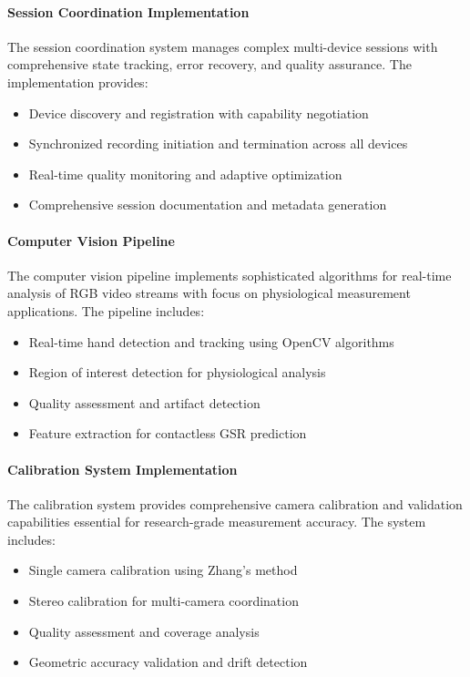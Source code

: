 \documentclass[12pt,a4paper]{report}
\begin{document}
\paragraph{Session Coordination Implementation}

The session coordination system manages complex multi-device sessions with comprehensive state tracking, error recovery,
and quality assurance. The implementation provides:

\begin{itemize}
\item Device discovery and registration with capability negotiation
\item Synchronized recording initiation and termination across all devices
\item Real-time quality monitoring and adaptive optimization
\item Comprehensive session documentation and metadata generation

\end{itemize}
\paragraph{Computer Vision Pipeline}

The computer vision pipeline implements sophisticated algorithms for real-time analysis of RGB video streams with focus
on physiological measurement applications. The pipeline includes:

\begin{itemize}
\item Real-time hand detection and tracking using OpenCV algorithms
\item Region of interest detection for physiological analysis
\item Quality assessment and artifact detection
\item Feature extraction for contactless GSR prediction

\end{itemize}
\paragraph{Calibration System Implementation}

The calibration system provides comprehensive camera calibration and validation capabilities essential for
research-grade measurement accuracy. The system includes:

\begin{itemize}
\item Single camera calibration using Zhang's method
\item Stereo calibration for multi-camera coordination
\item Quality assessment and coverage analysis
\item Geometric accuracy validation and drift detection

\end{itemize}
\end{document}
